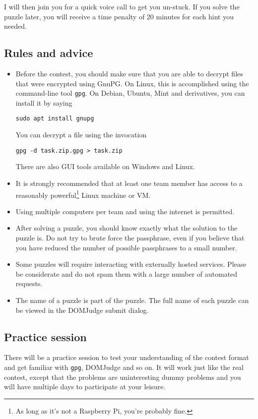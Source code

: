 \documentclass[fontsize=10pt,a4paper,DIV=12,parskip=half]{scrarticle}
\begin{document}
I will then join you for a quick voice call to get you un-stuck. If you solve
the puzzle later, you will receive a time penalty of 20 minutes for each hint
you needed.

\subsection*{Rules and advice}
\begin{itemize}
	\item Before the contest, you should make sure that you are able to decrypt
		files that were encrypted using GnuPG. On Linux, this is accomplished
		using the command-line tool \texttt{gpg}. On Debian, Ubuntu, Mint and derivatives, you can
		install it by saying
		\begin{center}
			\texttt{sudo apt install gnupg}
		\end{center}
		You can decrypt a file using the invocation
		\begin{center}
			\texttt{gpg -d task.zip.gpg > task.zip}
		\end{center}
		There are also GUI tools available on Windows and Linux.
	\item It is strongly recommended that at least one team member has access
		to a reasonably powerful\footnote{As long as it's not a Raspberry Pi, you're probably fine.} Linux machine or VM.
	\item Using multiple computers per team and using the internet is permitted.
	\item After solving a puzzle, you should know exactly what the solution to
		the puzzle is. Do not try to brute force the passphrase, even if you
		believe that you have reduced the number of possible passphrases to a
		small number.
	\item Some puzzles will require interacting with externally hosted services.
		Please be considerate and do not spam them with a large number of automated
		requests.
	\item The name of a puzzle is part of the puzzle. The full name of each puzzle
		can be viewed in the DOMJudge submit dialog.
\end{itemize}

\subsection*{Practice session}
There will be a practice session to test your understanding of the contest format and
get familiar with \texttt{gpg}, DOMJudge and so on. It will work just like the real
contest, except that the problems are uninteresting dummy problems and you will have
multiple days to participate at your leisure.
\end{document}

